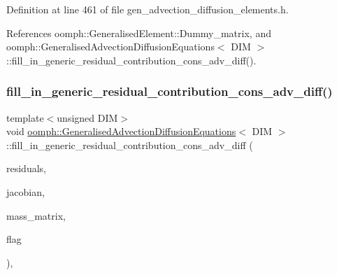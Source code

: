 Definition at line 461 of file gen\+\_\+advection\+\_\+diffusion\+\_\+elements.\+h.



References oomph\+::\+Generalised\+Element\+::\+Dummy\+\_\+matrix, and oomph\+::\+Generalised\+Advection\+Diffusion\+Equations$<$ D\+I\+M $>$\+::fill\+\_\+in\+\_\+generic\+\_\+residual\+\_\+contribution\+\_\+cons\+\_\+adv\+\_\+diff().

\mbox{\label{classoomph_1_1GeneralisedAdvectionDiffusionEquations_ae05de6e681f20f04f5ad9821f3a572c0}} 
\subsubsection{\texorpdfstring{fill\+\_\+in\+\_\+generic\+\_\+residual\+\_\+contribution\+\_\+cons\+\_\+adv\+\_\+diff()}{fill\_in\_generic\_residual\_contribution\_cons\_adv\_diff()}}
{\footnotesize\ttfamily template$<$unsigned D\+IM$>$ \\
void \hyperlink{classoomph_1_1GeneralisedAdvectionDiffusionEquations}{oomph\+::\+Generalised\+Advection\+Diffusion\+Equations}$<$ D\+IM $>$\+::fill\+\_\+in\+\_\+generic\+\_\+residual\+\_\+contribution\+\_\+cons\+\_\+adv\+\_\+diff (\begin{DoxyParamCaption}\item[{\hyperlink{classoomph_1_1Vector}{Vector}$<$ double $>$ \&}]{residuals,  }\item[{\hyperlink{classoomph_1_1DenseMatrix}{Dense\+Matrix}$<$ double $>$ \&}]{jacobian,  }\item[{\hyperlink{classoomph_1_1DenseMatrix}{Dense\+Matrix}$<$ double $>$ \&}]{mass\+\_\+matrix,  }\item[{unsigned}]{flag }\end{DoxyParamCaption})\hspace{0.3cm}{\ttfamily [protected]}, {\ttfamily [virtual]}}



